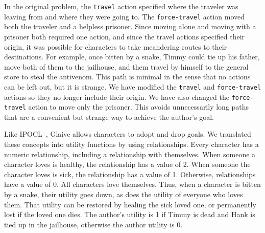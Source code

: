 \documentclass{nilreport}
\begin{document}
In the original problem, the \texttt{travel} action specified where
the traveler was leaving from and where they were going to. The \texttt{force-travel}
action moved both the traveler and a helpless prisoner. Since moving
alone and moving with a prisoner both required one action, and since
the travel actions specified their origin, it was possible for characters
to take meandering routes to their destinations. For example, once
bitten by a snake, Timmy could tie up his father, move both of them
to the jailhouse, and them travel by himself to the general store
to steal the antivenom. This path is minimal in the sense that no
actions can be left out, but it is strange. We have modified the \texttt{travel}
and \texttt{force-travel} actions so they no longer include their
origin. We have also changed the \texttt{force-travel} action to move
only the prisoner. This avoids unnecessarily long paths that are a
convenient but strange way to achieve the author's goal.

Like IPOCL~\cite{riedl2010narrative}, Glaive allows characters to
adopt and drop goals. We translated these concepts into utility functions
by using relationships. Every character has a numeric relationship,
including a relationship with themselves. When someone a character
loves is healthy, the relationship has a value of 2. When someone
the character loves is sick, the relationship has a value of 1. Otherwise,
relationships have a value of 0. All characters love themselves. Thus,
when a character is bitten by a snake, their utility goes down, as
does the utility of everyone who loves them. That utility can be restored
by healing the sick loved one, or permanently lost if the loved one
dies. The author's utility is 1 if Timmy is dead and Hank is tied
up in the jailhouse, otherwise the author utility is 0.

\medskip{}
\noindent{}
\end{document}

